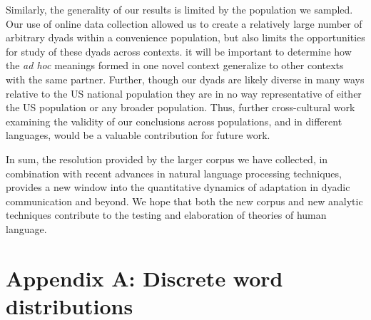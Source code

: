\documentclass[alpha-refs]{wiley-article}
\begin{document}
Similarly, the generality of our results is limited by the population we sampled.
Our use of online data collection allowed us to create a relatively large number of arbitrary dyads within a convenience population, but also limits the opportunities for study of these dyads across contexts.
it will be important to determine how the \emph{ad hoc} meanings formed in one novel context generalize to other contexts with the same partner.
Further, though our dyads are likely diverse in many ways relative to the US national population \citep{levay2016demographic} they are in no way representative of either the US population or any broader population.
Thus, further cross-cultural work examining the validity of our conclusions across populations, and in different languages, would be a valuable contribution for future work.

In sum, the resolution provided by the larger corpus we have collected, in combination with recent advances in natural language processing techniques, provides a new window into the quantitative dynamics of adaptation in dyadic communication and beyond.
We hope that both the new corpus and new analytic techniques contribute to the testing and elaboration of theories of human language.

%

\printendnotes



\section*{Appendix A: Discrete word distributions}
\end{document}
